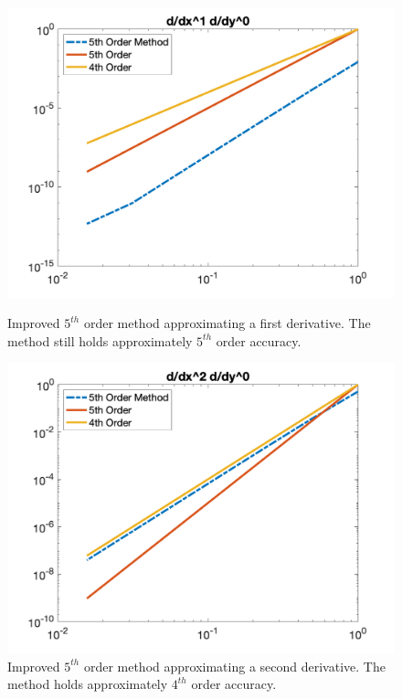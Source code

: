  \begin{figure}[htbp]
 	\centering
 	\begin{minipage}{.45\textwidth}
 		\centering
 		\includegraphics[width=1.0\linewidth]{figs/WeightsDer2.png}
 		\caption{Improved $5^{th}$ order method approximating a first derivative. The method still holds approximately $5^{th}$ order accuracy.}
 		\label{fig:wts1}
 	\end{minipage}%
 	\hfill
 	\begin{minipage}{0.45\textwidth}
 		\centering
 		\includegraphics[width=1.0\linewidth]{figs/WeightsDer3.png}
 		\caption{Improved $5^{th}$ order method approximating a second derivative. The method holds approximately $4^{th}$ order accuracy.}
 		\label{fig:wts2}
 	\end{minipage}
 \end{figure}
